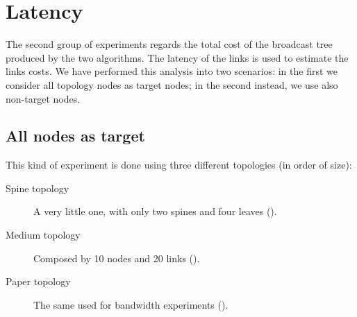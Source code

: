 \section{Latency}\label{sec:latency}

The second group of experiments regards the total cost of the broadcast tree
produced by the two algorithms. The latency of the links is used to estimate
the links costs. We have performed this analysis into two scenarios: in the
first we consider all topology nodes as target nodes; in the second
instead, we use also non-target nodes.

\subsection{All nodes as target}

This kind of experiment is done using three different topologies (in order of
size):
\begin{description}
	\item[Spine topology] A very little one, with only two spines and four
		leaves ().
	\item[Medium topology] Composed by 10 nodes and 20 links
		().
	\item [Paper topology] The same used for bandwidth experiments
		().
\end{description}


